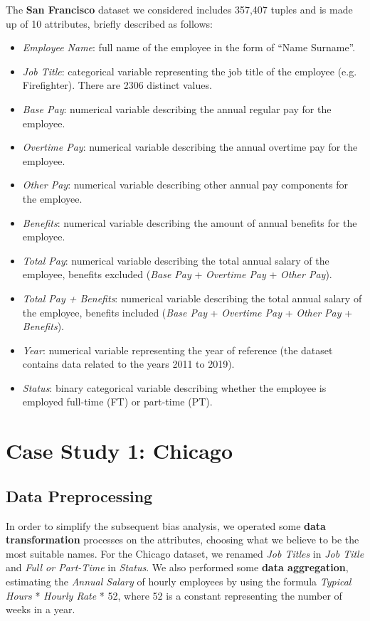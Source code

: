 The \textbf{San Francisco} dataset we considered includes 357,407 tuples and is made up of 10 attributes, briefly described as follows:
\begin{itemize}
\item \textit{Employee Name}: full name of the employee in the form of ``Name Surname''.
\item \textit{Job Title}: categorical variable representing the job title of the employee (e.g. Firefighter). There are 2306 distinct values.
\item \textit{Base Pay}: numerical variable describing the annual regular pay for the employee.
\item \textit{Overtime Pay}: numerical variable describing the annual overtime pay for the employee.
\item \textit{Other Pay}: numerical variable describing other annual pay components for the employee.
\item \textit{Benefits}: numerical variable describing the amount of annual benefits for the employee.
\item \textit{Total Pay}: numerical variable describing the total annual salary of the employee, benefits excluded (\textit{Base Pay} + \textit{Overtime Pay} + \textit{Other Pay}).
\item \textit{Total Pay + Benefits}: numerical variable describing the total annual salary of the employee, benefits included (\textit{Base Pay} + \textit{Overtime Pay} + \textit{Other Pay} + \textit{Benefits}).
\item \textit{Year}: numerical variable representing the year of reference (the dataset contains data related to the years 2011 to 2019).
\item \textit{Status}: binary categorical variable describing whether the employee is employed full-time (FT) or part-time (PT).
\end{itemize}


\section{Case Study 1: Chicago}
\subsection{Data Preprocessing}
\label{section:chicago_data_preprocessing}
In order to simplify the subsequent bias analysis, we operated some \textbf{data transformation} processes on the attributes, choosing what we believe to be the most suitable names. For the Chicago dataset, we renamed \textit{Job Titles} in \textit{Job Title} and \textit{Full or Part-Time} in \textit{Status}. We also performed some \textbf{data aggregation}, estimating the \textit{Annual Salary} of hourly employees by using the formula \textit{Typical Hours} * \textit{Hourly Rate} * 52, where 52 is a constant representing the number of weeks in a year.

